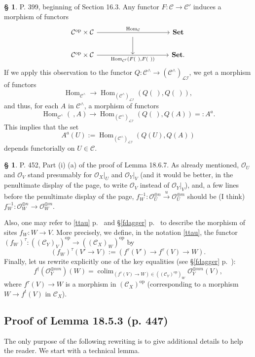 \documentclass[12pt]{article}
\theoremstyle{remark}
\theoremstyle{definition}
\newtheorem{s}[thm]{\S}
\newcommand{\cc}{\mathcal}
\newcommand{\C}{\mathcal C}
\newcommand{\Set}{\mathbf{Set}}
\newcommand{\xr}{\xrightarrow}
\DeclareMathOperator*{\co}{colim}
\DeclareMathOperator{\Hom}{Hom}%
\DeclareMathOperator{\op}{op}
\begin{document}
%
%
\begin{s}\label{399}
P. 399, beginning of Section 16.3. Any functor $F:\C\to\C'$ induces a morphism of functors 
$$
\begin{tikzcd}
%
\C^{\op}\times\C\ar{rrrr}{\Hom_\C}&&\ar{d}&&\Set\\ 
\C^{\op}\times\C\ar{rrrr}[swap]{\Hom_{\C'}(F(\ ),F(\ ))}&&{}&&\Set.
%
\end{tikzcd}
$$
If we apply this observation to the functor $Q:\C^\wedge\to(\C^\wedge)_{\cc{LI}}$, we get a morphism of functors 
$$
\Hom_{\C^\wedge}\to\Hom_{(\C^\wedge)_{\cc{LI}}}(Q(\ ),Q(\ )),
$$ 
and thus, for each $A$ in $\C^\wedge$, a morphism of functors 
$$
\Hom_{\C^\wedge}(\ ,A)\to\Hom_{(\C^\wedge)_{\cc{LI}}}(Q(\ ),Q(A))=:A^a.
$$ 
This implies that the set 
$$
A^a(U):=\Hom_{(\C^\wedge)_{\cc{LI}}}(Q(U),Q(A))
$$ 
depends functorially on $U\in\C$.
\end{s}
%
%
\begin{s}\label{1867}
P. 452, Part (i) (a) of the proof of Lemma 18.6.7. As already mentioned, $\cc O_U$ and $\cc O_V$ stand presumably for $\cc O_X|_U$ and $\cc O_Y|_V$ (and it would be better, in the penultimate display of the page, to write $\cc O_V$ instead of $\cc O_Y|_V$), and, a few lines before the penultimate display of the page, $f_W^{-1}:\cc O_U^{\oplus n}\xr u\cc O_U^{\oplus m}$ should be (I think) $f_W^{-1}:\cc O_W^{\oplus n}\to\cc O_W^{\oplus m}$. 

Also, one may refer to \eqref{ttau} p.~\pageref{ttau} and \S\ref{fdagger} p.~\pageref{fdagger} to describe the morphism of sites $f_W:W\to V$. More precisely, we define, in the notation \eqref{ttau}, the functor $(f_W)^\tau:((\C_Y)_V)^{\op}\to((\C_X)_W)^{\op}$ by
$$
(f_W)^\tau(V'\to V):=(f^\tau(V')\to f^\tau(V)\to W).
$$
Finally, let us rewrite explicitly one of the key equalities (see \S\ref{fdagger} p.~\pageref{fdagger}): 
$$
f^\dagger(\cc O_Y^{\oplus nm})(W)=\co_{(f^\tau(V)\to W)\in((\C_Y)^{\op})_W}\cc O_Y^{\oplus nm}(V),
$$ 
where $f^\tau(V)\to W$ is a morphism in $(\C_X)^{\op}$ (corresponding to a morphism $W\to f^t(V)$ in $\C_X$).
\end{s}
%
\subsection{Proof of Lemma 18.5.3 (p. 447)}\label{s1853}
%
The only purpose of the following rewriting is to give additional details to help the reader. We start with a technical lemma.
\end{document}
